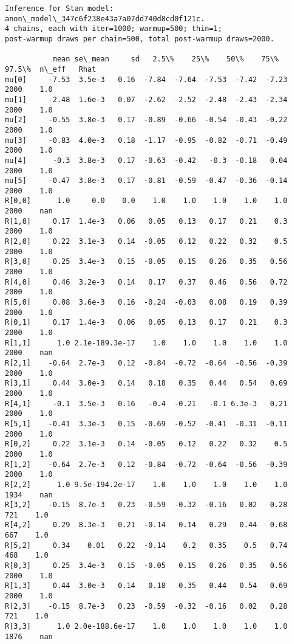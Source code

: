 \documentclass[11pt]{article}
\begin{document}
    \begin{Verbatim}[commandchars=\\\{\}]
Inference for Stan model: anon\_model\_347c6f238e43a7a07dd740d8cd0f121c.
4 chains, each with iter=1000; warmup=500; thin=1; 
post-warmup draws per chain=500, total post-warmup draws=2000.

           mean se\_mean     sd   2.5\%    25\%    50\%    75\%  97.5\%  n\_eff   Rhat
mu[0]     -7.53  3.5e-3   0.16  -7.84  -7.64  -7.53  -7.42  -7.23   2000    1.0
mu[1]     -2.48  1.6e-3   0.07  -2.62  -2.52  -2.48  -2.43  -2.34   2000    1.0
mu[2]     -0.55  3.8e-3   0.17  -0.89  -0.66  -0.54  -0.43  -0.22   2000    1.0
mu[3]     -0.83  4.0e-3   0.18  -1.17  -0.95  -0.82  -0.71  -0.49   2000    1.0
mu[4]      -0.3  3.8e-3   0.17  -0.63  -0.42   -0.3  -0.18   0.04   2000    1.0
mu[5]     -0.47  3.8e-3   0.17  -0.81  -0.59  -0.47  -0.36  -0.14   2000    1.0
R[0,0]      1.0     0.0    0.0    1.0    1.0    1.0    1.0    1.0   2000    nan
R[1,0]     0.17  1.4e-3   0.06   0.05   0.13   0.17   0.21    0.3   2000    1.0
R[2,0]     0.22  3.1e-3   0.14  -0.05   0.12   0.22   0.32    0.5   2000    1.0
R[3,0]     0.25  3.4e-3   0.15  -0.05   0.15   0.26   0.35   0.56   2000    1.0
R[4,0]     0.46  3.2e-3   0.14   0.17   0.37   0.46   0.56   0.72   2000    1.0
R[5,0]     0.08  3.6e-3   0.16  -0.24  -0.03   0.08   0.19   0.39   2000    1.0
R[0,1]     0.17  1.4e-3   0.06   0.05   0.13   0.17   0.21    0.3   2000    1.0
R[1,1]      1.0 2.1e-189.3e-17    1.0    1.0    1.0    1.0    1.0   2000    nan
R[2,1]    -0.64  2.7e-3   0.12  -0.84  -0.72  -0.64  -0.56  -0.39   2000    1.0
R[3,1]     0.44  3.0e-3   0.14   0.18   0.35   0.44   0.54   0.69   2000    1.0
R[4,1]     -0.1  3.5e-3   0.16   -0.4  -0.21   -0.1 6.3e-3   0.21   2000    1.0
R[5,1]    -0.41  3.3e-3   0.15  -0.69  -0.52  -0.41  -0.31  -0.11   2000    1.0
R[0,2]     0.22  3.1e-3   0.14  -0.05   0.12   0.22   0.32    0.5   2000    1.0
R[1,2]    -0.64  2.7e-3   0.12  -0.84  -0.72  -0.64  -0.56  -0.39   2000    1.0
R[2,2]      1.0 9.5e-194.2e-17    1.0    1.0    1.0    1.0    1.0   1934    nan
R[3,2]    -0.15  8.7e-3   0.23  -0.59  -0.32  -0.16   0.02   0.28    721    1.0
R[4,2]     0.29  8.3e-3   0.21  -0.14   0.14   0.29   0.44   0.68    667    1.0
R[5,2]     0.34    0.01   0.22  -0.14    0.2   0.35    0.5   0.74    468    1.0
R[0,3]     0.25  3.4e-3   0.15  -0.05   0.15   0.26   0.35   0.56   2000    1.0
R[1,3]     0.44  3.0e-3   0.14   0.18   0.35   0.44   0.54   0.69   2000    1.0
R[2,3]    -0.15  8.7e-3   0.23  -0.59  -0.32  -0.16   0.02   0.28    721    1.0
R[3,3]      1.0 2.0e-188.6e-17    1.0    1.0    1.0    1.0    1.0   1876    nan

\end{Verbatim}
\end{document}
